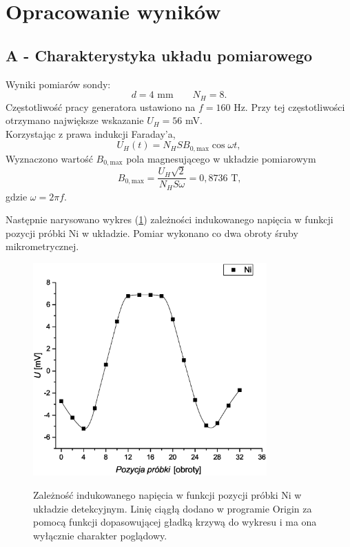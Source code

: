 \documentclass[11pt]{article}
\begin{document}
\section*{Opracowanie wyników}
\subsection*{A - Charakterystyka układu pomiarowego}
Wyniki pomiarów sondy:
$$d= 4 \mbox{ mm} \qquad N_H = 8.$$
Częstotliwość pracy generatora ustawiono na $f=160$ Hz. Przy tej częstotliwości otrzymano największe wskazanie $U_H = 56 $ mV.\\
Korzystając z prawa indukcji Faraday'a,
\begin{equation}
	U_H (t) = N_HSB_{0,\mbox{max}}\cos \omega t,
\end{equation}
Wyznaczono wartość $B_{0,\mbox{max}}$ pola magnesującego w układzie pomiarowym
\begin{equation}
	B_{0,\mbox{max}} = \frac{U_H \sqrt{2}}{N_HS\omega} = 0,8736 \mbox{ T,}
\end{equation}
gdzie $\omega=2\pi f$.

Następnie narysowano wykres (\ref{wyk_1}) zależności indukowanego napięcia w funkcji pozycji próbki Ni w układzie. Pomiar wykonano co dwa obroty śruby mikrometrycznej.

\begin{figure}[h!]
\centering
\includegraphics[width=0.8\textwidth]{./img/W1.eps}
\caption{Zależność indukowanego napięcia w funkcji pozycji próbki Ni w układzie detekcyjnym. Linię ciągłą dodano w programie Origin za pomocą 
funkcji dopasowującej gładką krzywą do wykresu i ma ona wyłącznie charakter poglądowy.}{\label{wyk_1}}
\end{figure}
\end{document}

